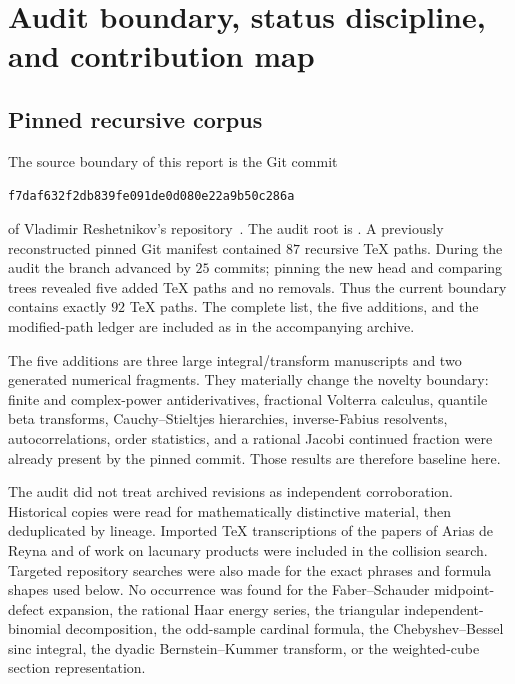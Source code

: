 \documentclass[11pt,oneside]{article}
\theoremstyle{definition}
\begin{document}
\clearpage

\section{Audit boundary, status discipline, and contribution map}
\label{p5:sec:audit}

\subsection{Pinned recursive corpus}

The source boundary of this report is the Git commit
\begin{center}
\nolinkurl{f7daf632f2db839fe091de0d080e22a9b50c286a}
\end{center}
of Vladimir Reshetnikov's \repo{} repository~\cite{p5:proveit}.  The audit root is
.  A previously reconstructed pinned Git
manifest contained $87$ recursive TeX paths.  During the audit the branch
advanced by $25$ commits; pinning the new head and comparing trees revealed
five added TeX paths and no removals.  Thus the current boundary contains
exactly $92$ TeX paths.  The complete list, the five additions, and the
modified-path ledger are included as
 in the accompanying archive.

The five additions are three large integral/transform manuscripts and two
generated numerical fragments.  They materially change the novelty boundary:
finite and complex-power antiderivatives, fractional Volterra calculus,
quantile beta transforms, Cauchy--Stieltjes hierarchies, inverse-Fabius
resolvents, autocorrelations, order statistics, and a rational Jacobi
continued fraction were already present by the pinned commit.  Those results
are therefore baseline here.

The audit did not treat archived revisions as independent corroboration.
Historical copies were read for mathematically distinctive material, then
deduplicated by lineage.  Imported TeX transcriptions of the papers of Arias
de Reyna and of work on lacunary products were included in the collision
search.  Targeted repository searches were also made for the exact phrases
and formula shapes used below.  No occurrence was found for the Faber--Schauder
midpoint-defect expansion, the rational Haar energy series, the triangular
independent-binomial decomposition, the odd-sample cardinal formula, the
Chebyshev--Bessel sinc integral, the dyadic Bernstein--Kummer transform, or the
weighted-cube section representation.
\end{document}
